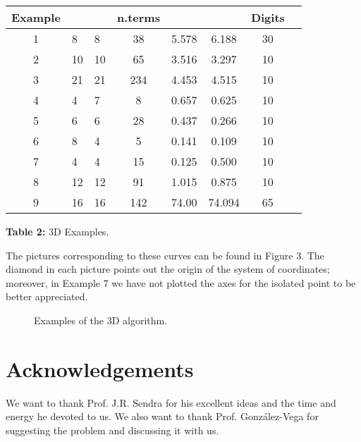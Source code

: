 \documentclass{elsart}
\begin{document}
\begin{center}
\begin{tabular}{|c|l|l|c|c|c|c|l|} \hline
Example &  &  & n.terms  &  &  & Digits  \\
\hline \hline 1 & 8 & 8 & 38  & 5.578 & 6.188 & 30  \\
\hline 2 & 10 & 10 & 65  & 3.516 & 3.297 & 10 \\
\hline 3 & 21 & 21 & 234  & 4.453 & 4.515 & 10 \\
\hline 4 & 4 & 7 & 8  & 0.657 & 0.625 & 10 \\
\hline 5 & 6 & 6 & 28  & 0.437 & 0.266 & 10 \\
\hline 6 & 8 & 4 & 5  & 0.141 & 0.109 & 10 \\
\hline 7 & 4 & 4 & 15  & 0.125 & 0.500 & 10 \\
\hline 8 & 12 & 12 & 91  & 1.015 & 0.875 & 10 \\
\hline 9 & 16 & 16 & 142  & 74.00 & 74.094 & 65\\
 \hline
\end{tabular}

{\bf Table 2:} 3D Examples.
\end{center}

The pictures corresponding to these curves can be found in Figure
3. The diamond in each picture points out the origin of the system
of coordinates; moreover, in Example 7 we have not plotted the
axes for the isolated point to be better appreciated.


\begin{figure}[ht]
\begin{center}
\centerline{}
\end{center}
\caption{Examples of the 3D algorithm.}
\end{figure}



\section{Acknowledgements}
We want to thank Prof. J.R. Sendra for his excellent ideas and the
time and energy he devoted to us. We also want to thank Prof.
Gonz\'alez-Vega for suggesting the problem and discussing it with
us.

\newpage
\end{document}
